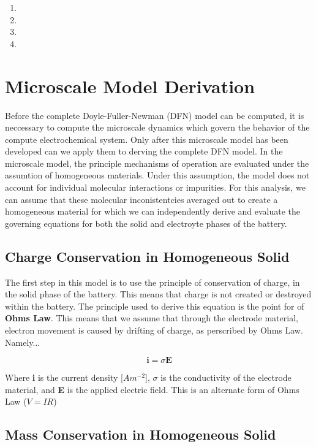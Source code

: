 \documentclass[lettersize,journal]{IEEEtran}
\begin{document}
\begin{enumerate}
  \item
  \item
  \item
  \item

\end{enumerate}



\section{Microscale Model Derivation}

Before the complete Doyle-Fuller-Newman (DFN) model can be computed, it is neccessary to compute the microscale dynamics which govern the behavior of the compute electrochemical system. Only after this microscale model has been developed can we apply them to derving the complete DFN model. In the microscale model, the principle mechanisms of operation are evaluated under the assumtion of homogeneous materials. Under this assumption, the model does not account for individual molecular interactions or impurities. For this analysis, we can assume that these molecular inconistentcies averaged out to create a homogeneous material for which we can independently derive and evaluate the governing equations for both the solid and electroyte phases of the battery.



\subsection{Charge Conservation in Homogeneous Solid}

The first step in this model is to use the principle of conservation of charge, in the solid phase of the battery. This means that charge is not created or destroyed within the battery. The principle used to derive this equation is the point for of \textbf{Ohms Law}. This means that we assume that through the electrode material, electron movement is caused by drifting of charge, as perscribed by Ohms Law. Namely...

\[
\textbf{i} = \sigma\textbf{E}
\]

Where \textbf{i} is the current density [$Am^{-2}$], $\sigma$ is the conductivity of the electrode material, and \textbf{E} is the applied electric field. This is an alternate form of Ohms Law ($V = IR$)


\subsection{Mass Conservation in Homogeneous Solid}
\end{document}
